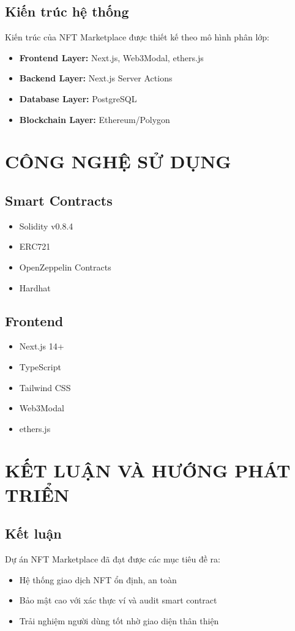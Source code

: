 \documentclass[a4paper,12pt]{report}
\begin{document}
\section{Kiến trúc hệ thống}
Kiến trúc của NFT Marketplace được thiết kế theo mô hình phân lớp:
\begin{itemize}
    \item \textbf{Frontend Layer:} Next.js, Web3Modal, ethers.js
    \item \textbf{Backend Layer:} Next.js Server Actions
    \item \textbf{Database Layer:} PostgreSQL
    \item \textbf{Blockchain Layer:} Ethereum/Polygon
\end{itemize}

\chapter{CÔNG NGHỆ SỬ DỤNG}
\section{Smart Contracts}
\begin{itemize}
    \item Solidity v0.8.4
    \item ERC721
    \item OpenZeppelin Contracts
    \item Hardhat
\end{itemize}

\section{Frontend}
\begin{itemize}
    \item Next.js 14+
    \item TypeScript
    \item Tailwind CSS
    \item Web3Modal
    \item ethers.js
\end{itemize}

\chapter{KẾT LUẬN VÀ HƯỚNG PHÁT TRIỂN}
\section{Kết luận}
Dự án NFT Marketplace đã đạt được các mục tiêu đề ra:
\begin{itemize}
    \item Hệ thống giao dịch NFT ổn định, an toàn
    \item Bảo mật cao với xác thực ví và audit smart contract
    \item Trải nghiệm người dùng tốt nhờ giao diện thân thiện
\end{itemize}
\end{document}
